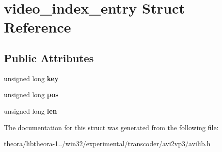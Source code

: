\hypertarget{structvideo__index__entry}{\section{video\+\_\+index\+\_\+entry Struct Reference}
\label{structvideo__index__entry}
}
\subsection*{Public Attributes}
\begin{DoxyCompactItemize}
\item 
\hypertarget{structvideo__index__entry_a33eefe709eec1a31ba776e95e3811869}{unsigned long {\bfseries key}}\label{structvideo__index__entry_a33eefe709eec1a31ba776e95e3811869}

\item 
\hypertarget{structvideo__index__entry_a1bbf7dddca9fa5eaab9728dac6327e48}{unsigned long {\bfseries pos}}\label{structvideo__index__entry_a1bbf7dddca9fa5eaab9728dac6327e48}

\item 
\hypertarget{structvideo__index__entry_a2eb9cac8a93e638dc5979d4278dca06c}{unsigned long {\bfseries len}}\label{structvideo__index__entry_a2eb9cac8a93e638dc5979d4278dca06c}

\end{DoxyCompactItemize}


The documentation for this struct was generated from the following file\+:\begin{DoxyCompactItemize}
\item 
theora/libtheora-\/1../win32/experimental/transcoder/avi2vp3/avilib.\+h\end{DoxyCompactItemize}
